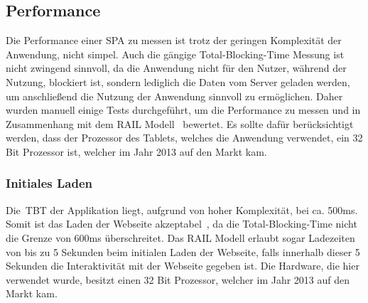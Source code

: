 \subsection{Performance}\label{subsec:performance}
Die Performance einer \gls{SPA} zu messen ist trotz der geringen Komplexität der Anwendung, nicht simpel.
Auch die gängige Total-Blocking-Time Messung ist nicht zwingend sinnvoll, da die Anwendung nicht für den Nutzer, während der Nutzung, blockiert ist, sondern lediglich die Daten vom Server geladen werden, um anschließend die Nutzung der Anwendung sinnvoll zu ermöglichen.
Daher wurden manuell einige Tests durchgeführt, um die Performance zu messen und in Zusammenhang mit dem RAIL Modell~\cite{RAILModell} bewertet.
Es sollte dafür berücksichtigt werden, dass der Prozessor des Tablets, welches die Anwendung verwendet, ein 32 Bit Prozessor ist, welcher im Jahr 2013 auf den Markt kam.
\newline
\newline
\subsubsection{Initiales Laden}
\newline
\newline
Die~\gls{TBT} der Applikation liegt, aufgrund von hoher Komplexität, bei ca. 500ms.
Somit ist das Laden der Webseite akzeptabel~\cite{TotalBlockingTime}, da die Total-Blocking-Time nicht die Grenze von 600ms überschreitet.
Das RAIL Modell erlaubt sogar Ladezeiten von bis zu 5 Sekunden beim initialen Laden der Webseite, falls innerhalb dieser 5 Sekunden die Interaktivität mit der Webseite gegeben ist.
Die Hardware, die hier verwendet wurde, besitzt einen 32 Bit Prozessor, welcher im Jahr 2013 auf den Markt kam.
\newline
